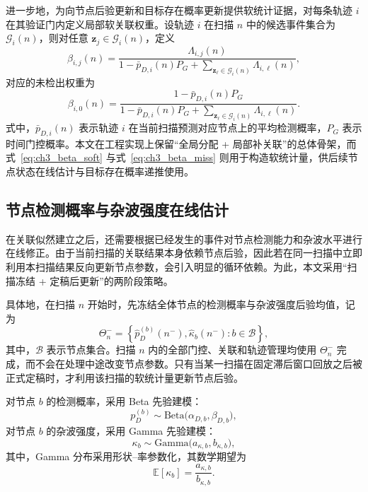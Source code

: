 \documentclass{xdupgthesis}
\begin{document}
进一步地，为向节点后验更新和目标存在概率更新提供软统计证据，对每条轨迹 $i$ 在其验证门内定义局部软关联权重。设轨迹 $i$ 在扫描 $n$ 中的候选事件集合为 $\mathcal G_i(n)$，则对任意 $\mathbf z_j\in\mathcal G_i(n)$，定义
\begin{equation}
	\beta_{i,j}(n)=
	\frac{\Lambda_{i,j}(n)}{1-\bar p_{D,i}(n)P_G+\sum\limits_{\mathbf z_\ell\in\mathcal G_i(n)}\Lambda_{i,\ell}(n)},
	\label{eq:ch3_beta_soft}
\end{equation}
对应的未检出权重为
\begin{equation}
	\beta_{i,0}(n)=
	\frac{1-\bar p_{D,i}(n)P_G}{1-\bar p_{D,i}(n)P_G+\sum\limits_{\mathbf z_\ell\in\mathcal G_i(n)}\Lambda_{i,\ell}(n)}.
	\label{eq:ch3_beta_miss}
\end{equation}
式中，$\bar p_{D,i}(n)$ 表示轨迹 $i$ 在当前扫描预测对应节点上的平均检测概率，$P_G$ 表示时间门控概率。本文在工程实现上保留“全局分配 + 局部补关联”的总体骨架，而式~\eqref{eq:ch3_beta_soft} 与式~\eqref{eq:ch3_beta_miss} 则用于构造软统计量，供后续节点状态在线估计与目标存在概率递推使用。

\subsection{节点检测概率与杂波强度在线估计}
\label{subsec:ch3_node_stats}

在关联似然建立之后，还需要根据已经发生的事件对节点检测能力和杂波水平进行在线修正。由于当前扫描的关联结果本身依赖节点后验，因此若在同一扫描中立即利用本扫描结果反向更新节点参数，会引入明显的循环依赖。为此，本文采用“扫描冻结 + 定稿后更新”的两阶段策略。

具体地，在扫描 $n$ 开始时，先冻结全体节点的检测概率与杂波强度后验均值，记为
\begin{equation}
	\Theta_n^{-}=
	\left\{
	\hat p_D^{(b)}(n^-),\hat\kappa_b(n^-):b\in\mathcal B
	\right\},
	\label{eq:ch3_theta_frozen}
\end{equation}
其中，$\mathcal B$ 表示节点集合。扫描 $n$ 内的全部门控、关联和轨迹管理均使用 $\Theta_n^{-}$ 完成，而不会在处理中途改变节点参数。只有当某一扫描在固定滞后窗口回放之后被正式定稿时，才利用该扫描的软统计量更新节点后验。

对节点 $b$ 的检测概率，采用 Beta 先验建模：
\begin{equation}
	p_D^{(b)}\sim \mathrm{Beta}\bigl(\alpha_{D,b},\beta_{D,b}\bigr),
	\label{eq:ch3_beta_prior}
\end{equation}
对节点 $b$ 的杂波强度，采用 Gamma 先验建模：
\begin{equation}
	\kappa_b\sim \mathrm{Gamma}\bigl(a_{\kappa,b},b_{\kappa,b}\bigr),
	\label{eq:ch3_gamma_prior}
\end{equation}
其中，Gamma 分布采用形状--率参数化，其数学期望为
\begin{equation}
	\mathbb E[\kappa_b]=\frac{a_{\kappa,b}}{b_{\kappa,b}}.
	\label{eq:ch3_kappa_mean}
\end{equation}
\end{document}
